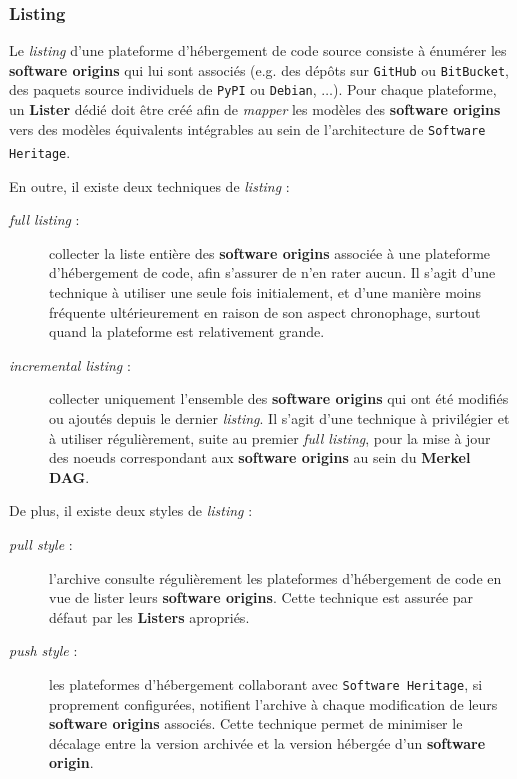 \documentclass[12pt,a4paper]{report}
\theoremstyle{definition}
\begin{document}
\subsubsection{Listing}
Le \textit{listing} d'une plateforme d'hébergement de code source consiste à énumérer les \textbf{software origins} qui lui sont associés (e.g. des dépôts sur \texttt{GitHub} ou \texttt{BitBucket}, des paquets source individuels de \texttt{PyPI} ou \texttt{Debian}, $\dots$). Pour chaque plateforme, un \textbf{Lister} dédié doit être créé afin de \og \textit{mapper} \fg les modèles des \textbf{software origins} vers des modèles équivalents intégrables au sein de l'architecture de \texttt{Software Heritage}\textsuperscript{\citep{dicosmoWhyAndHow}}.

En outre, il existe deux techniques de \textit{listing} :
\begin{description}
	\item [\textit{full listing} :] collecter la liste entière des \textbf{software origins} associée à une plateforme d'hébergement de code, afin s'assurer de n'en rater aucun. Il s'agit d'une technique à utiliser une seule fois initialement, et d'une manière moins fréquente ultérieurement en raison de son aspect chronophage, surtout quand la plateforme est relativement grande.
	\item [\textit{incremental listing} :] collecter uniquement l'ensemble des \textbf{software origins} qui ont été modifiés ou ajoutés depuis le dernier \textit{listing}. Il s'agit d'une technique à privilégier et à utiliser régulièrement, suite au premier \textit{full listing}, pour la mise à jour des noeuds correspondant aux \textbf{software origins} au sein du \textbf{Merkel DAG}.
\end{description}

De plus, il existe deux styles de \textit{listing} :
\begin{description}
	\item [\textit{pull style} :] l'archive consulte régulièrement les plateformes d'hébergement de code en vue de lister leurs \textbf{software origins}. Cette technique est assurée par défaut par les \textbf{Listers} apropriés.
	\item [\textit{push style} :] les plateformes d'hébergement collaborant avec \texttt{Software Heritage}, si proprement configurées, notifient l'archive à chaque modification de leurs \textbf{software origins} associés. Cette technique permet de minimiser le décalage entre la version archivée et la version hébergée d'un \textbf{software origin}.
\end{description}
\end{document}
